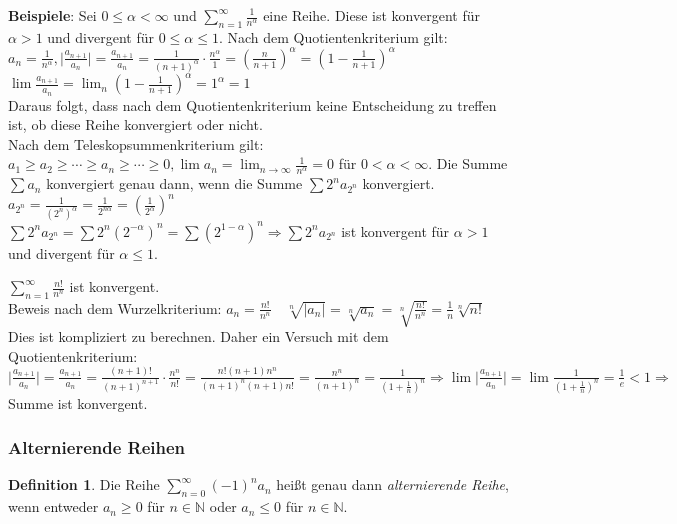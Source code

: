 \documentclass[ngerman,titlepage,twoside, parskip=half*]{scrreprt}
\newcommand*{\N}{\mathbb{N}}
\theoremstyle{plain}
\theoremstyle{definition}
\newtheorem{definition}{Definition}
\theoremstyle{remark}
\newcommand*{\abs}[2][]{#1\lvert#2#1\rvert}
\begin{document}
\textbf{Beispiele}: Sei $0\leq \alpha <\infty$ und $\sum_{n=1}^\infty \frac{1}{n^\alpha}$ eine Reihe. Diese ist
konvergent für $\alpha>1$ und divergent für $0\leq \alpha \leq 1$. Nach dem Quotientenkriterium gilt:\\
$a_n=\frac{1}{n^\alpha}, \abs{\frac{a_{n+1}}{a_n}}=\frac{a_{n+1}}{a_n}=\frac{1}{(n+1)^\alpha}\cdot \frac{n^\alpha}{1}=
(\frac{n}{n+1})^\alpha=(1-\frac{1}{n+1})^\alpha$\\
$\lim \frac{a_{n+1}}{a_n}=\lim_n (1-\frac{1}{n+1})^\alpha=1^\alpha=1$\\
Daraus folgt, dass nach dem Quotientenkriterium keine Entscheidung zu treffen ist, ob diese Reihe konvergiert oder nicht.\\
Nach dem Teleskopsummenkriterium gilt:\\
$a_1\geq a_2\geq \cdots \geq a_n\geq \cdots \geq 0, \lim a_n=\lim_{n\rightarrow \infty}\frac{1}{n^\alpha}=0$ für $0<
\alpha<\infty$. Die Summe $\sum a_n$ konvergiert genau dann, wenn die Summe $\sum 2^na_{2^n}$ konvergiert.\\
$a_{2^n}=\frac{1}{(2^n)^\alpha}=\frac{1}{2^{n\alpha}}=(\frac{1}{2^\alpha})^n$\\
$\sum 2^na_{2^n}=\sum2^n(2^{-\alpha})^n=\sum (2^{1-\alpha})^n\Rightarrow \sum 2^na_{2^n}$ ist konvergent für $\alpha>1$
und divergent für $\alpha \leq 1$.

$\sum_{n=1}^\infty \frac{n!}{n^n}$ ist konvergent.\\
Beweis nach dem Wurzelkriterium: $a_n=\frac{n!}{n^n} \quad \sqrt[n]{\abs{a_n}}=\sqrt[n]{a_n}=\sqrt[n]{\frac{n!}{n^n}}=
\frac{1}{n}\sqrt[n]{n!}$ Dies ist kompliziert zu berechnen. Daher ein Versuch mit dem Quotientenkriterium:\\
$\abs{\frac{a_{n+1}}{a_n}}=\frac{a_{n+1}}{a_n}=\frac{(n+1)!}{(n+1)^{n+1}}\cdot \frac{n^n}{n!}=\frac{n!(n+1)n^n}{(n+1)^n(n+1)n!}
=\frac{n^n}{(n+1)^n}=\frac{1}{(1+\frac{1}{n})^n}\Rightarrow \lim \abs{\frac{a_{n+1}}{a_n}}=\lim \frac{1}{(1+\frac{1}{n})^n}=
\frac{1}{e}<1\Rightarrow$  Summe ist konvergent.

\subsubsection{Alternierende Reihen}
\begin{definition}
Die Reihe $\sum_{n=0}^\infty (-1)^na_n$ heißt genau dann \emph{alternierende Reihe}, wenn
entweder $a_n\geq 0$ für $n \in \N$ oder $a_n\leq 0$ für $n \in \N$.
\end{definition}
\end{document}
